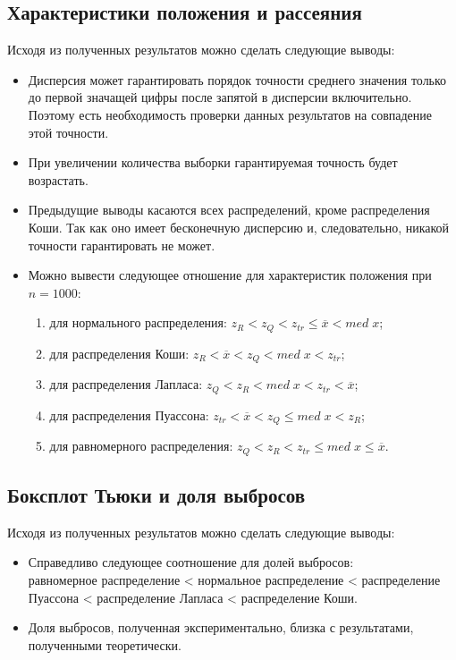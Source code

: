 \documentclass[12pt,a4paper]{article}
\begin{document}
	\subsection{Характеристики положения и рассеяния}
		Исходя из полученных результатов можно сделать следующие выводы:
		\begin{itemize}
			\item Дисперсия может гарантировать порядок точности среднего значения только до первой значащей цифры после запятой в дисперсии включительно. Поэтому есть необходимость проверки данных результатов на совпадение этой точности.
			
			\item При увеличении количества выборки гарантируемая точность будет возрастать.
			
			\item Предыдущие выводы касаются всех распределений, кроме распределения Коши. Так как оно имеет бесконечную дисперсию и, следовательно, никакой точности гарантировать не может.
			
			\item Можно вывести следующее отношение для характеристик положения при $n=1000$:
			\begin{enumerate}
				\item для нормального распределения: $z_R < z_Q < z_{tr} \leq \overline{x} < med\;x$;
				
				\item для распределения Коши: $z_R < \overline{x} < z_Q < med\;x < z_{tr}$;
				
				\item для распределения Лапласа: $z_Q < z_R < med\;x < z_{tr} < \overline{x}$;
				
				\item для распределения Пуассона: $ z_{tr} < \overline{x} < z_Q \leq med\;x < z_R$;
				
				\item для равномерного распределения: $z_Q < z_R < z_{tr} \leq med\;x \leq \overline{x}$.
			\end{enumerate}
		\end{itemize}
	
	\subsection{Боксплот Тьюки и доля выбросов}
		Исходя из полученных результатов можно сделать следующие выводы:
		\begin{itemize}
			\item Справедливо следующее соотношение для долей выбросов:\\
			равномерное распределение < нормальное распределение < распределение Пуассона < распределение Лапласа < распределение Коши.
			
			\item Доля выбросов, полученная экспериментально, близка с результатами, полученными теоретически.
		\end{itemize}
	
\end{document}
